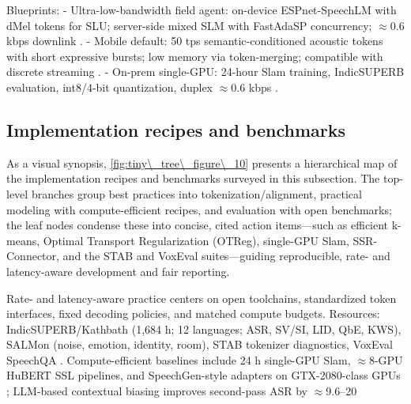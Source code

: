 \documentclass{article}
\begin{document}
Blueprints:
- Ultra-low-bandwidth field agent: on-device ESPnet-SpeechLM with dMel tokens for SLU; server-side mixed SLM with FastAdaSP concurrency; $\approx$0.6 kbps downlink \cite{bai2025dmelspeechtokenizationmadesimple,tian2025espnetspeechlmopenspeechlanguagemodeltoo,entry2025indicsuperbspeechprocessinguniversalperf,lu2024fastadaspmultitaskadaptedefficientinfere}.
- Mobile default: 50 tps semantic-conditioned acoustic tokens with short expressive bursts; low memory via token-merging; compatible with discrete streaming \cite{mousavi2024dasbdiscreteaudiospeechbenchmark,yang2025diffsoundstreamefficientspeechtokenizati,lu2024fastadaspmultitaskadaptedefficientinfere,zhao2024textlessstreamingspeechtranslationsemant}.
- On-prem single-GPU: 24-hour Slam training, IndicSUPERB evaluation, int8/4-bit quantization, duplex $\approx$0.6 kbps \cite{maimon2025slammingtrainingspeechlanguagemodelonegp,entry2025indicsuperbspeechprocessinguniversalperf,dao2025ichigomixedmodalearlyfusionrealtimevoice}.

\subsection{Implementation recipes and benchmarks} \label{subsec:Implementation recipes and benchmarks}
As a visual synopsis, \autoref{fig:tiny\_tree\_figure\_10} presents a hierarchical map of the implementation recipes and benchmarks surveyed in this subsection. The top-level branches group best practices into tokenization/alignment, practical modeling with compute-efficient recipes, and evaluation with open benchmarks; the leaf nodes condense these into concise, cited action items---such as efficient k-means, Optimal Transport Regularization (OTReg), single-GPU Slam, SSR-Connector, and the STAB and VoxEval suites---guiding reproducible, rate- and latency-aware development and fair reporting.

Rate- and latency-aware practice centers on open toolchains, standardized token interfaces, fixed decoding policies, and matched compute budgets. Resources: IndicSUPERB/Kathbath (1,684 h; 12 languages; ASR, SV/SI, LID, QbE, KWS), SALMon (noise, emotion, identity, room), STAB tokenizer diagnostics, VoxEval SpeechQA \cite{entry2025indicsuperbspeechprocessinguniversalperf,maimon2025salmonsuiteacousticlanguagemodelevaluati,vashishth2024stabspeechtokenizerassessmentbenchmark,cui2025voxevalbenchmarkingknowledgeunderstandin}. Compute-efficient baselines include 24 h single-GPU Slam, $\approx$8-GPU HuBERT SSL pipelines, and SpeechGen-style adapters on GTX-2080-class GPUs \cite{maimon2025slammingtrainingspeechlanguagemodelonegp,chen2023reducingbarriersselfsupervisedlearninghu,wu2023speechgenunlockinggenerativepowerspeechl}; LLM-based contextual biasing improves second-pass ASR by $\approx$9.6--20%
\end{document}
